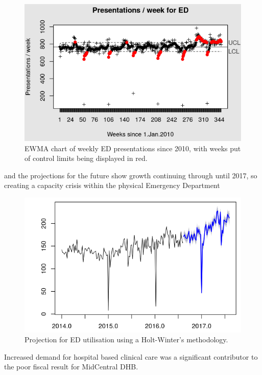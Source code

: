 \documentclass[11pt,a4paper]{article}
\begin{document}
\begin{figure}[htp]
\centering
\includegraphics[scale=0.70]{EWMA_ED_pesentations.png}
\caption{EWMA chart of weekly ED presentations since 2010, with weeks put of control limits being displayed in red.}
\label{EWMA statistical process chart of ED presentations}
\end{figure}

and the projections for the future show growth continuing through until 2017, so creating a capacity crisis within the physical Emergency Department

\begin{figure}[htp]
\centering
\includegraphics[scale=0.70]{HW_projections.png}
\caption{Projection for ED utilisation using a Holt-Winter's methodology.}
\label{Projections for ED utilisation through to 2017}
\end{figure}

Increased demand for hospital based clinical care was a significant contributor to the poor fiscal result for MidCentral DHB.\\
\end{document}
